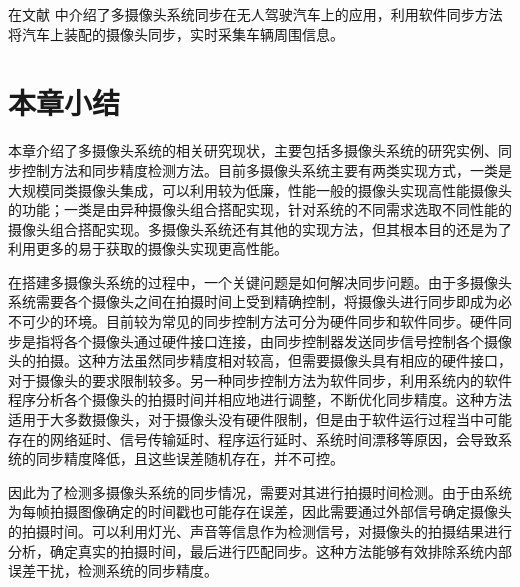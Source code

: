 在文献 \cite{macmillan2015auto, schaffner2016vehicle} 中介绍了多摄像头系统同步在无人驾驶汽车上的应用，利用软件同步方法将汽车上装配的摄像头同步，实时采集车辆周围信息。

\section{本章小结}

本章介绍了多摄像头系统的相关研究现状，主要包括多摄像头系统的研究实例、同步控制方法和同步精度检测方法。目前多摄像头系统主要有两类实现方式，一类是大规模同类摄像头集成，可以利用较为低廉，性能一般的摄像头实现高性能摄像头的功能；一类是由异种摄像头组合搭配实现，针对系统的不同需求选取不同性能的摄像头组合搭配实现。多摄像头系统还有其他的实现方法，但其根本目的还是为了利用更多的易于获取的摄像头实现更高性能。

在搭建多摄像头系统的过程中，一个关键问题是如何解决同步问题。由于多摄像头系统需要各个摄像头之间在拍摄时间上受到精确控制，将摄像头进行同步即成为必不可少的环境。目前较为常见的同步控制方法可分为硬件同步和软件同步。硬件同步是指将各个摄像头通过硬件接口连接，由同步控制器发送同步信号控制各个摄像头的拍摄。这种方法虽然同步精度相对较高，但需要摄像头具有相应的硬件接口，对于摄像头的要求限制较多。另一种同步控制方法为软件同步，利用系统内的软件程序分析各个摄像头的拍摄时间并相应地进行调整，不断优化同步精度。这种方法适用于大多数摄像头，对于摄像头没有硬件限制，但是由于软件运行过程当中可能存在的网络延时、信号传输延时、程序运行延时、系统时间漂移等原因，会导致系统的同步精度降低，且这些误差随机存在，并不可控。

因此为了检测多摄像头系统的同步情况，需要对其进行拍摄时间检测。由于由系统为每帧拍摄图像确定的时间戳也可能存在误差，因此需要通过外部信号确定摄像头的拍摄时间。可以利用灯光、声音等信息作为检测信号，对摄像头的拍摄结果进行分析，确定真实的拍摄时间，最后进行匹配同步。这种方法能够有效排除系统内部误差干扰，检测系统的同步精度。
